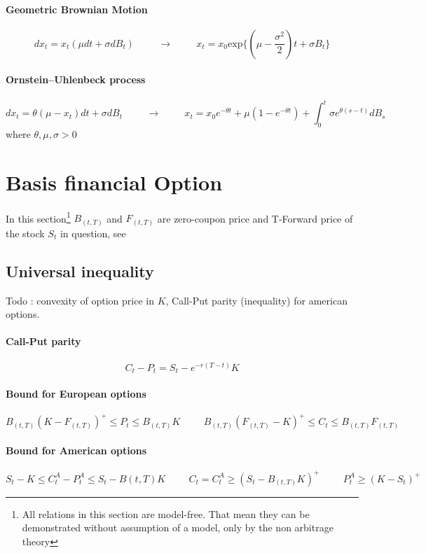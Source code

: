 \documentclass[a4paper,10pt]{article}
\newcommand{\eTt}{e^{-r(T-t)}}
\begin{document}
\paragraph{Geometric Brownian Motion}
\[
dx_t = x_t (\mu dt + \sigma dB_t ) 
\hspace{1cm} \longrightarrow \hspace{1cm}
x_t = x_0\text{exp}\{(\mu-\frac{\sigma^2}{2})t +\sigma B_t  \}
\]
\paragraph{Ornstein–Uhlenbeck process}
\[
dx_t = \theta (\mu-x_t) dt + \sigma dB_t
\hspace{1cm} \longrightarrow \hspace{1cm}
x_t = x_0e^{-\theta t} + \mu(1-e^{-\theta t}) +\int_0^t \sigma e^{\theta(s-t)}dB_s
\]
where $\theta,\mu,\sigma >0$





\section{Basis financial Option}
In this section\footnote{ All relations in this section are model-free. That mean they can be demonstrated without assumption of a model, only by the non arbitrage theory} $B_{(t,T)}$ and $F_{(t,T)}$ are zero-coupon price and T-Forward price of the stock $S_t$ in question, see  ~\cite{HULL} 
\subsection{Universal inequality}
Todo : convexity of option price in $K$, Call-Put parity (inequality) for american options.
\paragraph{Call-Put parity} 
\[
C_t - P_t = S_t - \eTt K
\]
\paragraph{Bound for European options}
\[
B_{(t,T)}(K-F_{(t,T)})^+ \leq P_t \leq B_{(t,T)}K 
\hspace{1cm}
B_{(t,T)}(F_{(t,T)}-K)^+ \leq C_t \leq B_{(t,T)}F_{(t,T)}
\]
\paragraph{Bound for American options}
\[
S_t - K \leq C^A_t - P^A_t \leq S_t - B(t,T)K
\hspace{1cm}
C_t = C^A_t \geq (S_t - B_{(t,T)}K)^+
\hspace{1cm}
P^A_t \geq (K - S_t)^+
\]
\end{document}
